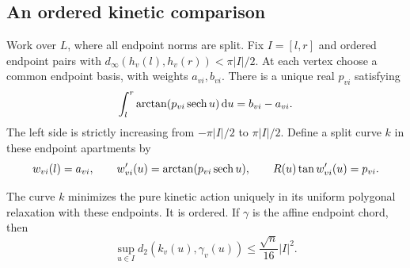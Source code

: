 \subsection{An ordered kinetic comparison}
Work over $L$, where all endpoint norms are split. Fix $I=[l,r]$ and
ordered endpoint pairs with
$d_\infty(h_v(l),h_v(r))<\pi|I|/2$. At each vertex choose a common
endpoint basis, with weights $a_{vi},b_{vi}$. There is a unique real
$p_{vi}$ satisfying
\begin{equation}\label{eq:bridgeparameter}
 \int_l^r\arctan(p_{vi}\operatorname{sech} u)\,\mathrm d u=b_{vi}-a_{vi}.
\end{equation}
The left side is strictly increasing from $-\pi|I|/2$ to
$\pi|I|/2$. Define a split curve $k$ in these endpoint apartments by
\begin{equation}\label{eq:kineticbridge}
 w_{vi}(l)=a_{vi},\qquad
 w_{vi}'(u)=\arctan(p_{vi}\operatorname{sech} u),\qquad
 R(u)\tan w_{vi}'(u)=p_{vi}.
\end{equation}

\begin{lemma}\label{lem:kineticbridge}
The curve $k$ minimizes the pure kinetic action uniquely in its uniform
polygonal relaxation with these endpoints. It is ordered. If $\gamma$
is the affine endpoint chord, then
\begin{equation}\label{eq:bridgechord}
 \sup_{u\in I}d_2(k_v(u),\gamma_v(u))
                   \le\frac{\sqrt n}{16}|I|^2.
\end{equation}
\end{lemma}

